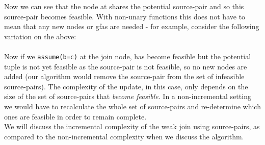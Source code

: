 Now we can see that the node  at  shares the potential source-pair \m{[b,c]} and so this source-pair becomes feasible.
With non-unary functions this does not have to mean that any new nodes or gfas are needed - for example, consider the following variation on the above:\\
\\
Now if we \lstinline{assume(b=c)} at the join node, \m{[b,c]} has become feasible but the potential tuple \m{[(b,d),(c,e)]} is not yet feasible as the source-pair \m{[d,e]} is not feasible, so no new nodes are added (our algorithm would remove the source-pair \m{[b,c]} from the set of infeasible source-pairs). The complexity of the update, in this case, only depends on the size of the set of source-pairs that \emph{become feasible}. In a non-incremental setting we would have to recalculate the whole set of source-pairs and re-determine 
which ones are feasible in order to remain complete.\\
We will discuss the incremental complexity of the weak join using source-pairs, as compared to the non-incremental complexity when we discuss the algorithm. 

